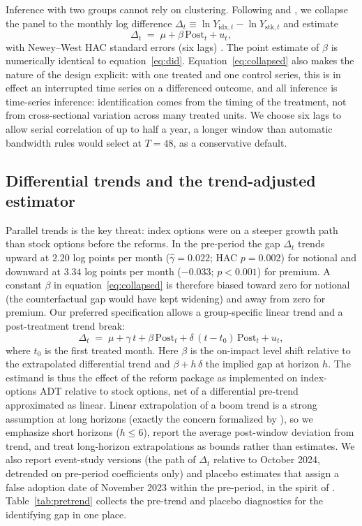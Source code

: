 \documentclass[12pt]{article}
\begin{document}
Inference with two groups cannot rely on clustering. Following
\citet{donaldlang2007} and \citet{bertrand2004}, we collapse the panel to the
monthly log difference $\Delta_t \equiv \ln Y_{\text{idx},t} - \ln
Y_{\text{stk},t}$ and estimate
\begin{equation}
\Delta_t \;=\; \mu + \beta\, \mathrm{Post}_t + u_t,
\label{eq:collapsed}
\end{equation}
with Newey--West HAC standard errors (six lags) \citep{neweywest1987}. The
point estimate of $\beta$ is numerically identical to
equation~\eqref{eq:did}. Equation~\eqref{eq:collapsed} also makes the nature
of the design explicit: with one treated and one control series, this is in
effect an interrupted time series on a differenced outcome, and all
inference is time-series inference: identification comes from the timing
of the treatment, not from cross-sectional variation across many treated
units. We choose six lags to allow serial correlation of up to half a year,
a longer window than automatic bandwidth rules would select at $T=48$, as a
conservative default.

\subsection{Differential trends and the trend-adjusted estimator}

Parallel trends is the key threat: index options were on a steeper growth
path than stock options before the reforms. In the pre-period the gap
$\Delta_t$ trends upward at $2.20$ log points per month
($\hat{\gamma}=0.022$; HAC $p = 0.002$) for notional and downward at
$3.34$ log points per month ($-0.033$; $p<0.001$) for premium. A constant
$\beta$ in equation~\eqref{eq:collapsed} is therefore biased toward zero for
notional (the counterfactual gap would have kept widening) and away from
zero for premium. Our preferred specification allows a group-specific linear
trend and a post-treatment trend break:
\begin{equation}
\Delta_t \;=\; \mu + \gamma\, t + \beta\, \mathrm{Post}_t
+ \delta\,(t - t_0)\,\mathrm{Post}_t + u_t,
\label{eq:ta}
\end{equation}
where $t_0$ is the first treated month. Here $\beta$ is the on-impact level
shift relative to the extrapolated differential trend and $\beta +
h\,\delta$ the implied gap at horizon $h$. The estimand is thus the effect
of the reform package as implemented on index-options ADT relative to stock
options, net of a differential pre-trend approximated as linear. Linear
extrapolation of a boom
trend is a strong assumption at long horizons (exactly the concern
formalized by \citet{rambachanroth2023}), so we emphasize short horizons
($h \leq 6$), report the average post-window deviation from trend, and treat
long-horizon extrapolations as bounds rather than estimates. We also report
event-study versions (the path of $\Delta_t$ relative to October 2024,
detrended on pre-period coefficients only) and placebo estimates that assign
a false adoption date of November 2023 within the pre-period, in the spirit
of \citet{conleytaber2011}. Table~\ref{tab:pretrend} collects the pre-trend
and placebo diagnostics for the identifying gap in one place.
\end{document}
